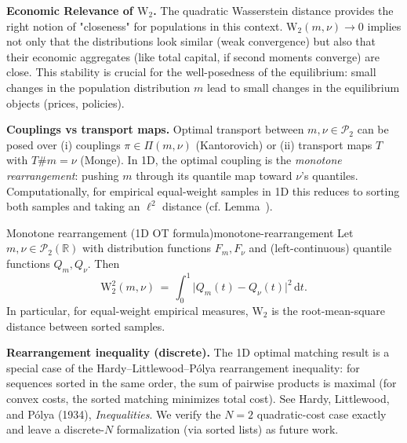 ﻿\documentclass[11pt,letterpaper,oneside]{article}
\numberwithin{equation}{section}
\newcommand{\R}{\mathbb{R}}
\newcommand{\1}{\mathbf{1}}
\begin{document}

\begin{tcolorbox}[didacticstyle]
\textbf{Economic Relevance of $\mathrm W_2$.}
The quadratic Wasserstein distance provides the right notion of "closeness" for populations in this context. $\mathrm W_2(m,\nu)\to 0$ implies not only that the distributions look similar (weak convergence) but also that their economic aggregates (like total capital, if second moments converge) are close. This stability is crucial for the well-posedness of the equilibrium: small changes in the population distribution $m$ lead to small changes in the equilibrium objects (prices, policies).
\end{tcolorbox}

\begin{tcolorbox}[mathstyle]
\textbf{Couplings vs transport maps.} Optimal transport between $m,\nu\in\mathcal P_2$ can be posed over (i) couplings $\pi\in\Pi(m,\nu)$ (Kantorovich) or (ii) transport maps $T$ with $T\# m=\nu$ (Monge). In 1D, the optimal coupling is the \emph{monotone rearrangement}: pushing $m$ through its quantile map toward $\nu$'s quantiles. Computationally, for empirical equal-weight samples in 1D this reduces to sorting both samples and taking an $\ell^2$ distance (cf. Lemma~).
\end{tcolorbox}

\begin{lemma}{Monotone rearrangement (1D OT formula)}{monotone-rearrangement}
Let $m,\nu\in\mathcal P_2(\R)$ with distribution functions $F_m,F_\nu$ and (left-continuous) quantile functions $Q_m,Q_\nu$. Then
\[
\mathrm W_2^2(m,\nu) \,=\, \int_0^1 \big| Q_m(t) - Q_\nu(t)\big|^2\,\mathrm dt.
\]
In particular, for equal-weight empirical measures, $\mathrm W_2$ is the root-mean-square distance between sorted samples.
\end{lemma}

\begin{tcolorbox}[literaturestyle]
\textbf{Rearrangement inequality (discrete).} The 1D optimal matching result is a special case of the Hardy--Littlewood--P\'olya rearrangement inequality: for sequences sorted in the same order, the sum of pairwise products is maximal (for convex costs, the sorted matching minimizes total cost). See Hardy, Littlewood, and P\'olya (1934), \emph{Inequalities}. We verify the $N=2$ quadratic-cost case exactly and leave a discrete-$N$ formalization (via sorted lists) as future work.
\end{tcolorbox}
\end{document}
